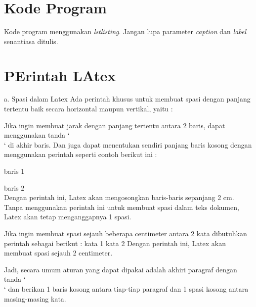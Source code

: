 \section{Kode Program}
Kode program menggunakan \textit{lstlisting}. Jangan lupa parameter \textit{caption} dan \textit{label} senantiasa ditulis.


\section {PErintah LAtex}
a. Spasi dalam Latex
Ada perintah khusus untuk membuat spasi dengan panjang tertentu baik secara horizontal maupun vertikal, yaitu :

Jika ingin membuat jarak dengan panjang tertentu antara 2 baris, dapat menggunakan tanda ‘ \\ ‘ di akhir baris. Dan juga dapat menentukan sendiri panjang baris kosong dengan menggunakan perintah seperti contoh berikut ini :

baris 1 \\

\vspace{2cm}

baris 2 \\
Dengan perintah ini, Latex akan mengosongkan baris-baris sepanjang 2 cm. Tanpa menggunakan perintah ini untuk membuat spasi dalam teks dokumen, Latex akan tetap menganggapnya 1 spasi.

Jika ingin membuat spasi sejauh beberapa centimeter antara 2 kata dibutuhkan perintah sebagai berikut :
kata 1 \hspace{2cm} kata 2
Dengan perintah ini, Latex akan membuat spasi sejauh 2 centimeter.

Jadi, secara umum aturan yang dapat dipakai adalah akhiri paragraf dengan tanda ‘ \\ ‘ dan berikan 1 baris kosong antara tiap-tiap paragraf dan 1 spasi kosong antara masing-masing kata.


